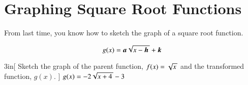 \section{Graphing Square Root Functions}

From last time,
you know how to sketch the graph 
of a  square root function.

{\centering
\begin{tcolorbox}[width=3in]
    \large%
    \[   g(x) = {\boldsymbol a} \myRoot{x-{\boldsymbol h}} + {\boldsymbol k}   \]
\end{tcolorbox}
}

\begin{myWideProblem}[\normalsize]{3in}[
    Sketch the graph of the parent function, $f(x)=\myRoot{x}$ and the transformed function, $g(x)$.
    ]{
        $g(x) = -2\myRoot{x+4} - 3$
    }
\end{myWideProblem}

